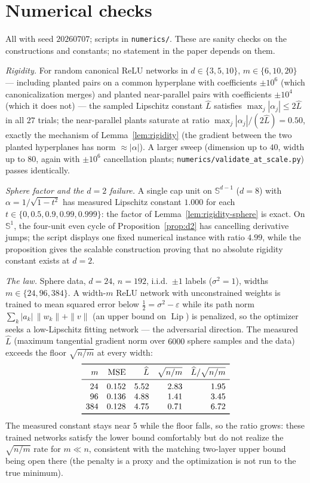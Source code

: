 \documentclass[11pt,reqno]{amsart}
\theoremstyle{plain}
\theoremstyle{definition}
\theoremstyle{remark}
\newcommand{\Sd}{\mathbb{S}^{d-1}}
\newcommand{\eps}{\varepsilon}
\newcommand{\Lip}{\operatorname{Lip}}
\begin{document}
\section{Numerical checks}\label{sec:numerics}

All with seed $20260707$; scripts in \texttt{numerics/}. These are sanity checks on the constructions and constants; no statement in the paper depends on them.

\emph{Rigidity.} For random canonical ReLU networks in $d\in\{3,5,10\}$, $m\in\{6,10,20\}$ --- including planted pairs on a common hyperplane with coefficients $\pm10^6$ (which canonicalization merges) and planted near-parallel pairs with coefficients $\pm10^4$ (which it does not) --- the sampled Lipschitz constant $\widehat L$ satisfies $\max_j|\alpha_j|\le2\widehat L$ in all $27$ trials; the near-parallel plants saturate at ratio $\max_j|\alpha_j|/(2\widehat L)=0.50$, exactly the mechanism of Lemma~\ref{lem:rigidity} (the gradient between the two planted hyperplanes has norm $\approx|\alpha|$). A larger sweep (dimension up to $40$, width up to $80$, again with $\pm10^6$ cancellation plants; \texttt{numerics/validate\_at\_scale.py}) passes identically.

\emph{Sphere factor and the $d=2$ failure.} A single cap unit on $\Sd$ ($d=8$) with $\alpha=1/\sqrt{1-t^2}$ has measured Lipschitz constant $1.000$ for each $t\in\{0,0.5,0.9,0.99,0.999\}$: the factor of Lemma~\ref{lem:rigidity-sphere} is exact. On $\mathbb S^1$, the four-unit even cycle of Proposition~\ref{prop:d2} has cancelling derivative jumps; the script displays one fixed numerical instance with ratio $4.99$, while the proposition gives the scalable construction proving that no absolute rigidity constant exists at $d=2$.

\emph{The law.} Sphere data, $d=24$, $n=192$, i.i.d.\ $\pm1$ labels ($\sigma^2=1$), widths $m\in\{24,96,384\}$. A width-$m$ ReLU network with unconstrained weights is trained to mean squared error below $\tfrac12=\sigma^2-\eps$ while its path norm $\sum_k|a_k|\,\|w_k\|+\|v\|$ (an upper bound on $\Lip$) is penalized, so the optimizer seeks a low-Lipschitz fitting network --- the adversarial direction. The measured $\widehat L$ (maximum tangential gradient norm over $6000$ sphere samples and the data) exceeds the floor $\sqrt{n/m}$ at every width:
\[
\begin{array}{rrrrr}
\toprule
m & \text{MSE} & \widehat L & \sqrt{n/m} & \widehat L/\sqrt{n/m}\\
\midrule
24 & 0.152 & 5.52 & 2.83 & 1.95\\
96 & 0.136 & 4.88 & 1.41 & 3.45\\
384 & 0.128 & 4.75 & 0.71 & 6.72\\
\bottomrule
\end{array}
\]
The measured constant stays near $5$ while the floor falls, so the ratio grows: these trained networks satisfy the lower bound comfortably but do not realize the $\sqrt{n/m}$ rate for $m\ll n$, consistent with the matching two-layer upper bound being open there (the penalty is a proxy and the optimization is not run to the true minimum).
\end{document}
